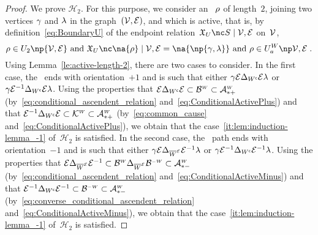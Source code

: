 \documentclass[12pt]{article}
\begin{document}
{{{\begin{proof}
  We prove ${\mathcal H}_{2}$. For this purpose, we consider an \undirectedEdgePath~$\rho$ of length~$2$,
  joining two vertices $\gamma$ and $\lambda$ in the graph~$({\cal V},{\cal E})$, and 
  which is active, that is, by definition~\eqref{eq:BoundaryU} of the
  endpoint relation~\( \BoundaryU{\SubsetPath}{\OrientedGraph} \) on~${\cal V}$, 
  \begin{equation*}
    \UndirectedPath \in \UPATH_{2}\np{\graph}
    \text{ and }
    \BoundaryU{\na{\UndirectedPath}}{\graph}=\na{ \np{\bgent,\cgent} }
    \text{ and }
    \UndirectedPath \in \ActiveUndirectedPaths{\graph}
    \eqfinp 
  \end{equation*}
  Using Lemma~\ref{le:active-length-2}, there are two cases to consider.
  In the first case, the \undirectedEdgePath\ ends with orientation~$+1$  and is
  such that
  either \(\gamma  {\cal E} \Delta_{W^{\mathsf{c}}}{\cal E}  \lambda\)
  or \(\gamma   {\cal E}^{-1} \Delta_{W^{\mathsf{c}}} {\cal E}  \lambda\).
  Using the properties that
  \( {\cal E} \Delta_{W^{\mathsf{c}}}{\cal E}
  \subset \mathcal{B}^{\text{\tiny $W$}}
  \subset \mathcal{A}^{\text{\tiny $W$}}_{*+}\)
  (by~\eqref{eq:conditional_ascendent_relation} and~\eqref{eq:ConditionalActivePlus})
  and that 
  \( {\cal E}^{-1} \Delta_{W^{\mathsf{c}}} {\cal E}
  \subset \mathcal{K}^{\text{\tiny $W$}} \subset \mathcal{A}^{\text{\tiny $W$}}_{*+}\)
  (by~\eqref{eq:common_cause} and~\eqref{eq:ConditionalActivePlus}),
  we obtain that
  the case~\ref{it:lem:induction-lemma_-1} of~${\mathcal H}_2$ is satisfied.
  In the second case, the \undirectedEdgePath\ path ends with orientation~$-1$ and is
  such that
  either 
  \( \gamma{\cal E} \Delta_{\overline{W}^{\text{\tiny ${\cal E}$}}} {\cal E}^{-1}\lambda \)
  or \( \gamma {\cal E}^{-1} \Delta_{W^{\mathsf{c}}}{\cal E}^{-1} \lambda\).
  Using the properties that
  \({\cal E} \Delta_{\overline{W}^{\text{\tiny ${\cal E}$}}} {\cal E}^{-1}
  \subset   \mathcal{B}^{\text{\tiny $W$}}  \Delta_{\overline{W}^{\text{\tiny ${\cal E}$}}} \mathcal{B}^{\text{\tiny$-W$}}
  \subset \mathcal{A}^{\text{\tiny $W$}}_{*-} \)
  (by~\eqref{eq:conditional_ascendent_relation}
  and~\eqref{eq:ConditionalActiveMinus})
  and that
  \({\cal E}^{-1} \Delta_{W^{\mathsf{c}}}{\cal E}^{-1}
  \subset \mathcal{B}^{\text{\tiny$-W$}}\subset \mathcal{A}^{\text{\tiny $W$}}_{*-}\)
  (by~\eqref{eq:converse_conditional_ascendent_relation}
  and~\eqref{eq:ConditionalActiveMinus}),
  we obtain that the case~\ref{it:lem:induction-lemma_-1} of~${\mathcal H}_2$ is
  satisfied.
  

\end{proof}}}}
\end{document}
